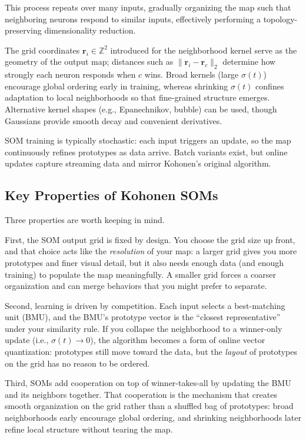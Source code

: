 This process repeats over many inputs, gradually organizing the map such that neighboring neurons respond to similar inputs, effectively performing a topology-preserving dimensionality reduction.

The grid coordinates \(\mathbf{r}_i \in \mathbb{Z}^2\) introduced for the neighborhood kernel serve as the geometry of the output map; distances such as \(\|\mathbf{r}_i - \mathbf{r}_c\|_2\) determine how strongly each neuron responds when \(c\) wins. Broad kernels (large \(\sigma(t)\)) encourage global ordering early in training, whereas shrinking \(\sigma(t)\) confines adaptation to local neighborhoods so that fine-grained structure emerges. Alternative kernel shapes (e.g., Epanechnikov, bubble) can be used, though Gaussians provide smooth decay and convenient derivatives.

SOM training is typically stochastic: each input triggers an update, so the map continuously refines prototypes as data arrive. Batch variants exist, but online updates capture streaming data and mirror Kohonen's original algorithm.

\subsection{Key Properties of Kohonen SOMs}
\label{sec:som_key_properties_of_kohonen_soms}

Three properties are worth keeping in mind.

First, the SOM output grid is fixed by design. You choose the grid size up front, and that choice acts like the \emph{resolution} of your map: a larger grid gives you more prototypes and finer visual detail, but it also needs enough data (and enough training) to populate the map meaningfully. A smaller grid forces a coarser organization and can merge behaviors that you might prefer to separate.

Second, learning is driven by competition. Each input selects a best\hyp{}matching unit (BMU), and the BMU's prototype vector is the ``closest representative'' under your similarity rule. If you collapse the neighborhood to a winner\hyp{}only update (i.e., \(\sigma(t)\to 0\)), the algorithm becomes a form of online vector quantization: prototypes still move toward the data, but the \emph{layout} of prototypes on the grid has no reason to be ordered.

Third, SOMs add cooperation on top of winner\hyp{}takes\hyp{}all by updating the BMU and its neighbors together. That cooperation is the mechanism that creates smooth organization on the grid rather than a shuffled bag of prototypes: broad neighborhoods early encourage global ordering, and shrinking neighborhoods later refine local structure without tearing the map.

